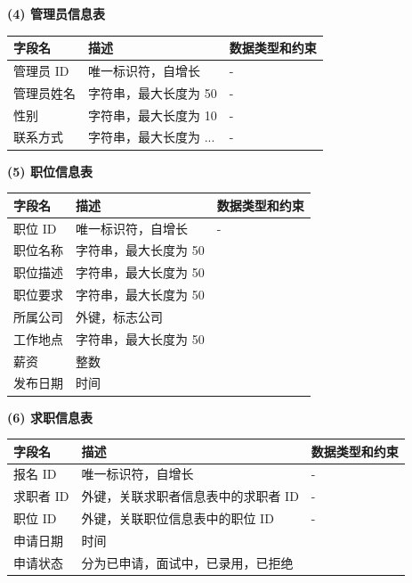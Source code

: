 \documentclass[UTF8,a4paper,10pt]{ctexart}
\begin{document}
\textbf{(4) 管理员信息表}\\
\begin{center}
\begin{tabular}{|l|l|l|}
\hline
字段名 & 描述 & 数据类型和约束 \\
\hline
管理员 ID & 唯一标识符，自增长 & - \\\hline
管理员姓名 & 字符串，最大长度为 50 & - \\\hline
性别 & 字符串，最大长度为 10 & - \\\hline
联系方式 & 字符串，最大长度为 ... & - \\\hline
\hline
\end{tabular}
\end{center}

\textbf{(5) 职位信息表}\\
\begin{center}
\begin{tabular}{|l|l|l|}
\hline
字段名 & 描述 & 数据类型和约束 \\
\hline
职位 ID & 唯一标识符，自增长 & - \\
\hline
 职位名称& 字符串，最大长度为 50&\\\hline
 职位描述& 字符串，最大长度为 50&\\\hline
 职位要求& 字符串，最大长度为 50&\\\hline
 所属公司& 外键，标志公司&\\\hline
 工作地点& 字符串，最大长度为 50&\\\hline
 薪资& 整数&\\\hline
 发布日期& 时间&\\\hline
\end{tabular}
\end{center}

\textbf{(6) 求职信息表}\\
\begin{center}
\begin{tabular}{|l|l|l|}
\hline
字段名 & 描述 & 数据类型和约束 \\
\hline
报名 ID & 唯一标识符，自增长 & - \\\hline
求职者 ID & 外键，关联求职者信息表中的求职者 ID & - \\\hline
职位 ID & 外键，关联职位信息表中的职位 ID & - \\
\hline
 申请日期& 时间&\\\hline
 申请状态& 分为已申请，面试中，已录用，已拒绝&\\\hline
\end{tabular}
\end{center}
\end{document}
